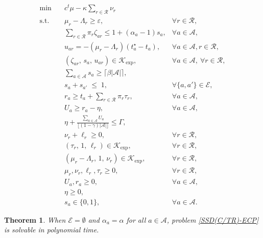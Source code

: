 \documentclass[10pt,a4paper]{amsart}
\newtheorem{theorem}{Theorem}
\def\A{\mathcal{A}}
\def\RR{\mathcal{R}}
\begin{document}
\begin{align}\tag*{\rm SSD(C/TR)-ECP}\label{SSD(C/TR)-ECP}
\min \quad
& c^{t}\mu - \kappa \sum_{r\in\mathcal{R}} \nu_r
\nonumber\\
\text{s.t.}\quad
& \mu_r - \Lambda_r \ge \varepsilon, &\forall r\in\mathcal{R},
\label{ctr:1}\\
& \sum_{r\in\RR} \pi_r \zeta_{ar}
\le 1 + (\alpha_a-1)s_a, & \forall a\in\mathcal{A},\nonumber
\\
& u_{ar} = -(\mu_r-\Lambda_r)(t_a^\star-t_a), & \forall a\in\mathcal{A}, r \in \RR,\label{ctr:u}\\
&(\zeta_{ar},\, s_a,\,
u_{ar})
\in \mathcal{K}_{\exp},& \forall a\in\mathcal{A},\ \forall r\in\mathcal{R},\nonumber\\
&\sum_{a\in\mathcal{A}} s_a \ge \lceil \beta |\mathcal{A}| \rceil,\nonumber\\
& s_a + s_{a'} \;\le\; 1, &\forall \{a,a'\}\in\mathcal{E},
\nonumber\\
& r_a \ge t_a + \sum_{r\in\mathcal{R}} \pi_r \tau_r, & \forall a\in\mathcal{A},
\label{ctr:6}\\
& U_a \ge r_a - \eta, &\forall a\in\mathcal{A},
\label{ctr:7}\\
& \eta + \frac{\sum_{a\in\mathcal{A}} U_a}{\lfloor (1-\gamma)|\A|\rfloor} \le \Gamma,
\label{ctr:8}\\
& \nu_r + \ell_r \ge 0, & \forall r\in\mathcal{R},
\label{ctr:9}\\
& (\tau_r,\,1,\,\ell_r) \in \mathcal{K}_{\exp},
&\forall r\in\mathcal{R},\label{ctr:9b}\\
& (\mu_r-\Lambda_r,\,1,\,\nu_r)
\in \mathcal{K}_{\exp}, & \forall r\in\mathcal{R},\label{ctr:10}\\
& \mu_r, \nu_r, \ell_r, \tau_r \geq 0, & \forall r \in \RR,\nonumber\\
& U_a, r_a \geq 0, & \forall a \in \A,\nonumber\\
& \eta \geq 0, \nonumber\\
& s_a \in \{0,1\}, & \forall a\in\mathcal{A}.\nonumber
\end{align}

\begin{theorem}
When $\mathcal E=\emptyset$ and $\alpha_a=\alpha$ for all $a\in\mathcal A$,
problem \ref{SSD(C/TR)-ECP} is solvable in polynomial time.
\end{theorem}
\end{document}
